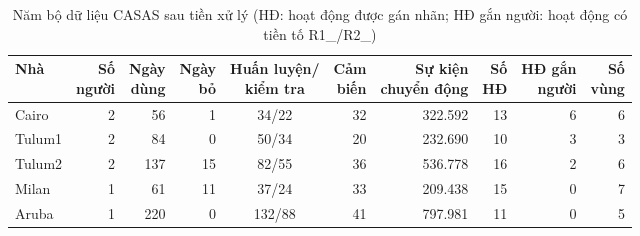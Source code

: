 \begin{table}[htbp]
\centering
\caption{Năm bộ dữ liệu CASAS sau tiền xử lý (HĐ: hoạt động được gán nhãn; HĐ gắn người: hoạt động có tiền tố R1\_/R2\_)}
\label{tab:data}
\small
\setlength{\tabcolsep}{4pt}
\begin{tabular}{lrrrcrrrrr}
\toprule
Nhà & \makecell{Số\\người} & \makecell{Ngày\\dùng} & \makecell{Ngày\\bỏ} & \makecell{Huấn luyện/\\kiểm tra} & \makecell{Cảm\\biến} & \makecell{Sự kiện\\chuyển động} & \makecell{Số\\HĐ} & \makecell{HĐ gắn\\người} & \makecell{Số\\vùng} \\
\midrule
Cairo & 2 & 56 & 1 & 34/22 & 32 & 322.592 & 13 & 6 & 6 \\
Tulum1 & 2 & 84 & 0 & 50/34 & 20 & 232.690 & 10 & 3 & 3 \\
Tulum2 & 2 & 137 & 15 & 82/55 & 36 & 536.778 & 16 & 2 & 6 \\
Milan & 1 & 61 & 11 & 37/24 & 33 & 209.438 & 15 & 0 & 7 \\
Aruba & 1 & 220 & 0 & 132/88 & 41 & 797.981 & 11 & 0 & 5 \\
\bottomrule
\end{tabular}
\end{table}
